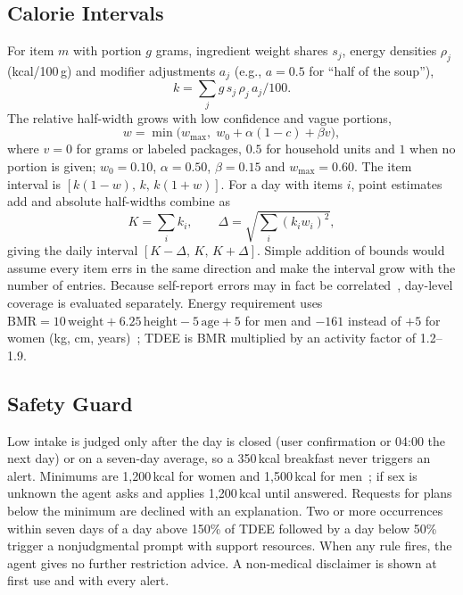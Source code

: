 \documentclass[conference]{IEEEtran}
\begin{document}
\subsection{Calorie Intervals}
For item $m$ with portion $g$ grams, ingredient weight shares $s_j$, energy densities $\rho_j$ (kcal/100\,g) and modifier adjustments $a_j$ (e.g., $a=0.5$ for ``half of the soup''),
\begin{equation}
k=\sum_j g\, s_j\, \rho_j\, a_j/100 .
\end{equation}
The relative half-width grows with low confidence and vague portions,
\begin{equation}
w=\min\!\bigl(w_{\max},\; w_0+\alpha(1-c)+\beta v\bigr),
\end{equation}
where $v=0$ for grams or labeled packages, $0.5$ for household units and $1$ when no portion is given; $w_0=0.10$, $\alpha=0.50$, $\beta=0.15$ and $w_{\max}=0.60$. The item interval is $[k(1-w),\,k,\,k(1+w)]$. For a day with items $i$, point estimates add and absolute half-widths combine as
\begin{equation}
\label{eq:day}
K=\sum_i k_i,\qquad \Delta=\sqrt{\textstyle\sum_i (k_i w_i)^2},
\end{equation}
giving the daily interval $[K-\Delta,\,K,\,K+\Delta]$. Simple addition of bounds would assume every item errs in the same direction and make the interval grow with the number of entries. Because self-report errors may in fact be correlated~\cite{poslusna2009}, day-level coverage is evaluated separately. Energy requirement uses $\text{BMR}=10\,\text{weight}+6.25\,\text{height}-5\,\text{age}+5$ for men and $-161$ instead of $+5$ for women (kg, cm, years)~\cite{mifflin1990}; TDEE is BMR multiplied by an activity factor of 1.2--1.9.

\subsection{Safety Guard}
Low intake is judged only after the day is closed (user confirmation or 04:00 the next day) or on a seven-day average, so a 350\,kcal breakfast never triggers an alert. Minimums are 1{,}200\,kcal for women and 1{,}500\,kcal for men~\cite{harvard2024}; if sex is unknown the agent asks and applies 1{,}200\,kcal until answered. Requests for plans below the minimum are declined with an explanation. Two or more occurrences within seven days of a day above 150\% of TDEE followed by a day below 50\% trigger a nonjudgmental prompt with support resources. When any rule fires, the agent gives no further restriction advice. A non-medical disclaimer is shown at first use and with every alert.
\end{document}
